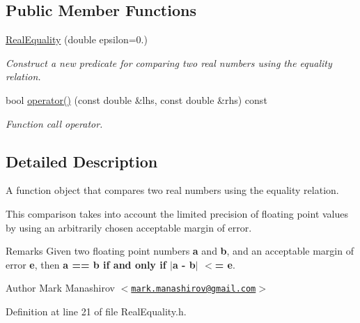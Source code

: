 \subsection*{\-Public \-Member \-Functions}
\begin{DoxyCompactItemize}
\item 
\hyperlink{classmetrobotics_1_1RealEquality_a018e98d7a4fb2f031a4dbc361a0d6bf1}{\-Real\-Equality} (double epsilon=0.)
\begin{DoxyCompactList}\small\item\em \-Construct a new predicate for comparing two real numbers using the equality relation. \end{DoxyCompactList}\item 
bool \hyperlink{classmetrobotics_1_1RealEquality_a6387b30bc3035e954421133ddb3a2268}{operator()} (const double \&lhs, const double \&rhs) const 
\begin{DoxyCompactList}\small\item\em \-Function call operator. \end{DoxyCompactList}\end{DoxyCompactItemize}


\subsection{\-Detailed \-Description}
\-A function object that compares two real numbers using the equality relation. 

\-This comparison takes into account the limited precision of floating point values by using an arbitrarily chosen acceptable margin of error.

\begin{DoxyRemark}{\-Remarks}
\-Given two floating point numbers {\bfseries a} and {\bfseries b}, and an acceptable margin of error {\bfseries e}, then {\bfseries a == b if and only if $|$a -\/ b$|$ $<$= e}.
\end{DoxyRemark}
\begin{DoxyAuthor}{\-Author}
\-Mark \-Manashirov $<$\href{mailto:mark.manashirov@gmail.com}{\tt mark.\-manashirov@gmail.\-com}$>$ 
\end{DoxyAuthor}


\-Definition at line 21 of file \-Real\-Equality.\-h.



